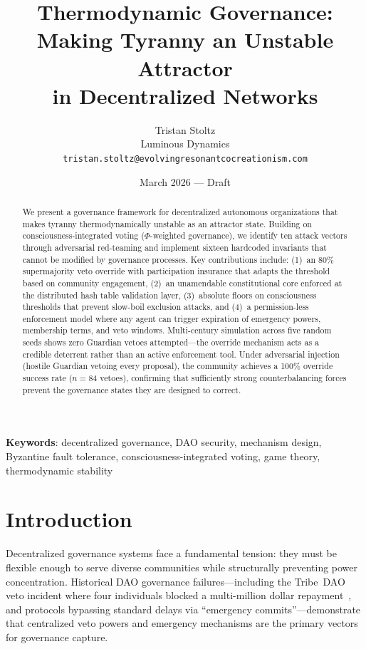 \documentclass[11pt,a4paper]{article}
\begin{document}
\title{\textbf{Thermodynamic Governance: Making Tyranny an Unstable Attractor\\in Decentralized Networks}}
\author{Tristan Stoltz\\Luminous Dynamics\\
\texttt{tristan.stoltz@evolvingresonantcocreationism.com}}
\date{March 2026 --- Draft}
\maketitle

\begin{abstract}
We present a governance framework for decentralized autonomous organizations that makes tyranny thermodynamically unstable as an attractor state. Building on consciousness-integrated voting ($\Phi$-weighted governance), we identify ten attack vectors through adversarial red-teaming and implement sixteen hardcoded invariants that cannot be modified by governance processes. Key contributions include: (1)~an 80\% supermajority veto override with participation insurance that adapts the threshold based on community engagement, (2)~an unamendable constitutional core enforced at the distributed hash table validation layer, (3)~absolute floors on consciousness thresholds that prevent slow-boil exclusion attacks, and (4)~a permission-less enforcement model where any agent can trigger expiration of emergency powers, membership terms, and veto windows. Multi-century simulation across five random seeds shows zero Guardian vetoes attempted---the override mechanism acts as a credible deterrent rather than an active enforcement tool. Under adversarial injection (hostile Guardian vetoing every proposal), the community achieves a 100\% override success rate ($n=84$ vetoes), confirming that sufficiently strong counterbalancing forces prevent the governance states they are designed to correct.
\end{abstract}

\noindent\textbf{Keywords}: decentralized governance, DAO security, mechanism design,
Byzantine fault tolerance, consciousness-integrated voting, game theory, thermodynamic stability

\section{Introduction}
\label{sec:intro}

Decentralized governance systems face a fundamental tension: they must be flexible enough to serve diverse communities while structurally preventing power concentration. Historical DAO governance failures---including the Tribe~DAO veto incident where four individuals blocked a multi-million dollar repayment~\cite{tribedao}, and protocols bypassing standard delays via ``emergency commits''---demonstrate that centralized veto powers and emergency mechanisms are the primary vectors for governance capture.
\end{document}
